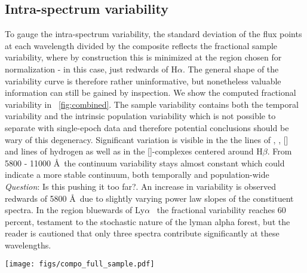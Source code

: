 \documentclass{aa}    %
\newcommand{\figref}[1]{\ref{fig:#1}}
\newcommand{\Fig}[1]{\figurename~\figref{#1}}
\newcommand{\fig}[1]{\Fig{#1}}
\newcommand{\figlabel}[1]{\label{fig:#1}}
\newcommand{\sectionname}{Section}
\newcommand{\Sect}[1]{\sectionname~\ref{sect:#1}}
\newcommand{\sect}[1]{\Sect{#1}}
\newcommand{\sectlabel}[1]{\label{sect:#1}}
\newcommand{\lya}{Ly$\alpha$}
\newcommand{\hb}{H$\beta$}
\newcommand{\ha}{H$\alpha$}
\newcommand{\oiii}{[\ion{O}{iii}]}
\newcommand{\feii}{[\ion{Fe}{ii}]}
\newcommand{\civ}{\ion{C}{iv}}
\newcommand{\mgii}{\ion{Mg}{ii}}
\newcommand{\todo}[3]{{\color{#2}\emph{#1}: #3}}
\newcommand{\qtodo}[1]{\todo{Question}{red}{#1}}
\begin{document}
 \subsection{Intra-spectrum variability}  \sectlabel{variability}
 
 To gauge the intra-spectrum variability, the standard deviation of the flux points at each wavelength divided by the composite reflects the fractional sample variability, where by construction this is minimized at the region chosen for normalization - in this case, just redwards of \ha. The general shape of the variability curve is therefore rather uninformative, but nonetheless valuable information can still be gained by inspection. We show the computed fractional variability in \fig{combined}. The sample variability contains both the temporal variability and the intrinsic population variability which is not possible to separate with single-epoch data and therefore potential conclusions should be wary of this degeneracy.
 Significant variation is visible in the the lines of \civ, \mgii, \oiii~ and lines of hydrogen as well as in the \feii-complexes centered around \hb. From 5800 - 11000 \AA~the continuum variability stays almost constant which could indicate a more stable continuum, both temporally and population-wide \qtodo{Is this pushing it too far?}. An increase in variability is observed redwards of 5800 \AA~due to slightly varying power law slopes of the constituent spectra. In the region bluewards of \lya~ the fractional variability reaches 60 percent, testament to the stochastic nature of the lyman alpha forest, but the reader is cautioned that only three spectra contribute significantly at these wavelengths.  
  
\begin{figure*}[t!]
\centering
\texttt{[image: figs/compo\_full\_sample.pdf]}
\caption[]{X-shooter quasar weighted arithmetic composite on a linear wavelength scale. The position of several prominent emission lines are marked. Overplot is the corresponding composite generated from the full sample of SDSS quasars fulfilling the selection criteria and general agreement is observed, albeit with a brighter balmer continuum in the SDSS-constructed composite. In red and green is shown the results from fitting both a pure and a broken power-law to the regions specified in \sect{results} and they are observed to be consistent.}
\figlabel{composite}
\end{figure*}
\end{document}
